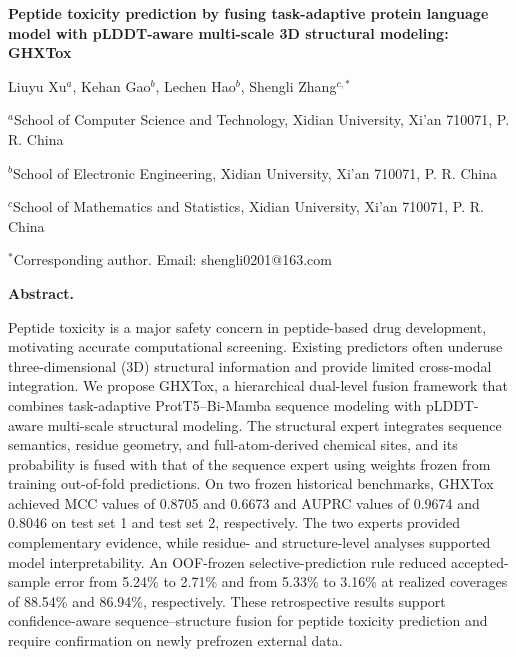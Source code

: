 \documentclass[12pt]{article}
\renewenvironment{abstract}{%
  \par\vspace{1.2em}\noindent\textbf{Abstract.}\ \ignorespaces
}{%
  \par
}
\begin{document}
\begin{center}
  \vspace*{0.15in}
  {\fontsize{16}{21}\selectfont\bfseries
  Peptide toxicity prediction by fusing task-adaptive protein language model
  with pLDDT-aware multi-scale 3D structural modeling: GHXTox\par}
  \vspace{1.3em}
  Liuyu Xu$^{a}$, Kehan Gao$^{b}$, Lechen Hao$^{b}$, Shengli Zhang$^{c,*}$\par
  \vspace{0.45em}
  \raggedright $^{a}$School of Computer Science and Technology, Xidian University,
  Xi'an 710071, P. R. China\par
  $^{b}$School of Electronic Engineering, Xidian University,
  Xi'an 710071, P. R. China\par
  $^{c}$School of Mathematics and Statistics, Xidian University,
  Xi'an 710071, P. R. China\par
  $^{*}$Corresponding author. Email: shengli0201@163.com\par
\end{center}

\begin{abstract}
Peptide toxicity is a major safety concern in peptide-based drug development,
motivating accurate computational screening. Existing predictors often
underuse three-dimensional (3D) structural information and provide limited
cross-modal integration. We propose GHXTox, a hierarchical dual-level fusion
framework that combines task-adaptive ProtT5--Bi-Mamba sequence modeling with
pLDDT-aware multi-scale structural modeling. The structural expert integrates
sequence semantics, residue geometry, and full-atom-derived chemical sites,
and its probability is fused with that of the sequence expert using weights
frozen from training out-of-fold predictions. On two frozen historical
benchmarks, GHXTox achieved MCC values of 0.8705 and 0.6673 and AUPRC values of
0.9674 and 0.8046 on test set 1 and test set 2, respectively. The two experts
provided complementary evidence, while residue- and structure-level analyses
supported model interpretability. An OOF-frozen selective-prediction rule
reduced accepted-sample error from 5.24\% to 2.71\% and from 5.33\% to 3.16\%
at realized coverages of 88.54\% and 86.94\%, respectively. These retrospective
results support confidence-aware sequence--structure fusion for peptide
toxicity prediction and require confirmation on newly prefrozen external data.
\end{abstract}
\end{document}

